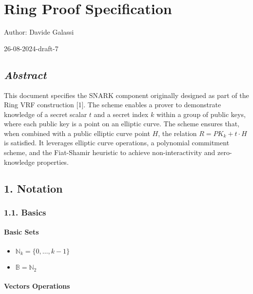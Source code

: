 \documentclass[
]{article}
\author{}
\date{}
\providecommand{\tightlist}{%
  \setlength{\itemsep}{0pt}\setlength{\parskip}{0pt}}
\begin{document}
\section{Ring Proof Specification}\label{ring-proof-specification}

Author: Davide Galassi

26-08-2024-draft-7

\subsection{\texorpdfstring{\emph{Abstract}}{Abstract}}\label{abstract}

This document specifies the SNARK component originally designed as part
of the Ring VRF construction {[}1{]}. The scheme enables a prover to
demonstrate knowledge of a secret scalar \(t\) and a secret index \(k\)
within a group of public keys, where each public key is a point on an
elliptic curve. The scheme ensures that, when combined with a public
elliptic curve point \(H\), the relation \(R = PK_k + t \cdot H\) is
satisfied. It leverages elliptic curve operations, a polynomial
commitment scheme, and the Fiat-Shamir heuristic to achieve
non-interactivity and zero-knowledge properties.

\subsection{1. Notation}\label{notation}

\subsubsection{1.1. Basics}\label{basics}

\paragraph{Basic Sets}\label{basic-sets}

\begin{itemize}
\tightlist
\item
  \(\mathbb{N}_k = \{0, \dots, k-1\}\)
\item
  \(\mathbb{B} = \mathbb{N}_2\)
\end{itemize}

\paragraph{Vectors Operations}\label{vectors-operations}
\end{document}
